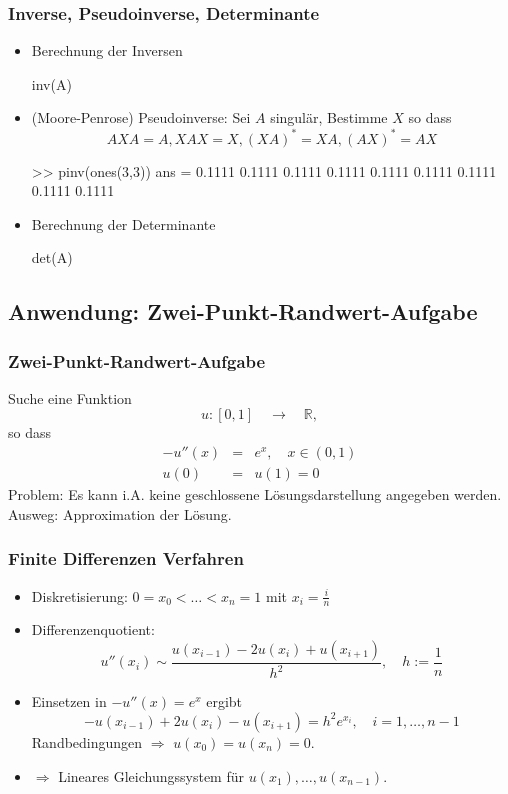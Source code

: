 \documentclass[hyperref={xetex}]{beamer}
\begin{document}
\begin{frame}[fragile]\frametitle{Inverse, Pseudoinverse, Determinante}
\begin{itemize}
\item Berechnung der Inversen
\begin{matlabin}
inv(A)
\end{matlabin}
\item (Moore-Penrose) Pseudoinverse: 
Sei $A$ singulär, Bestimme $X$ so dass 
\[ A X A=A,  X A X =X,  (X A)^* =X A,  (A X )^* = A X \]
\begin{matlabin}
>> pinv(ones(3,3))
ans =
    0.1111    0.1111    0.1111
    0.1111    0.1111    0.1111
    0.1111    0.1111    0.1111
\end{matlabin}
\item Berechnung der Determinante
\begin{matlabin}
det(A)
\end{matlabin}
\end{itemize}
\end{frame}

\subsection{Anwendung: Zwei-Punkt-Randwert-Aufgabe}
%
%
\begin{frame}[fragile]\frametitle{Zwei-Punkt-Randwert-Aufgabe}

Suche eine Funktion 
\begin{equation*}
u:[0,1] \quad \rightarrow \quad \mathbb{R}, 
\end{equation*}
so dass 
\begin{eqnarray*}
-u''(x) & = & e^x, \quad x \in (0,1)\\
u(0) & = & u(1) =0
\end{eqnarray*}
\alert{Problem:} Es kann i.A. keine geschlossene
Lösungsdarstellung angegeben werden. \\ %

\alert{Ausweg:} Approximation der Lösung. 
\end{frame}
%
%
\begin{frame}[fragile]\frametitle{Finite Differenzen Verfahren}

\begin{itemize}
 \item Diskretisierung: $0=x_0 < \dots < x_{n}=1$ mit $x_i=\frac{i}{n}$
\item Differenzenquotient: 
\[ u''(x_i) \sim \frac{u(x_{i-1}) - 2 u(x_i) + u(x_{i+1})}{ 
  h^2}, \quad h:=\frac{1}{n} \]
\item Einsetzen in $-u''(x)=e^x$ ergibt 
\[ -u(x_{i-1}) + 2 u(x_i) - u(x_{i+1}) =  h^2 e^{x_i}, \quad
i=1,\dots ,n-1 \] 
Randbedingungen $\Rightarrow $ $u(x_0)=u(x_n)=0$.
\item $\Rightarrow$ Lineares Gleichungssystem für 
$u(x_1), \dots ,u(x_{n-1})$.
\end{itemize}

\end{frame}
\end{document}
